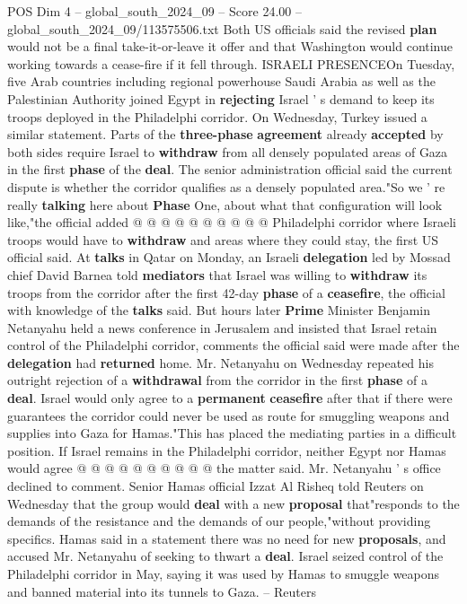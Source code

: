 \begin{textsample}{POS Dim 4 – global\_south\_2024\_09 – Score 24.00 – global\_south\_2024\_09/113575506.txt}
Both US officials said the revised \textbf{plan} would not be a final take-it-or-leave it offer and that Washington would continue working towards a cease-fire if it fell through.
ISRAELI PRESENCEOn Tuesday, five Arab countries including regional powerhouse Saudi Arabia as well as the Palestinian Authority joined Egypt in \textbf{rejecting} Israel ' s demand to keep its troops deployed in the Philadelphi corridor.
On Wednesday, Turkey issued a similar statement.
Parts of the \textbf{three-phase} \textbf{agreement} already \textbf{accepted} by both sides require Israel to \textbf{withdraw} from all densely populated areas of Gaza in the first \textbf{phase} of the \textbf{deal}.
The senior administration official said the current dispute is whether the corridor qualifies as a densely populated area."So we ' re really \textbf{talking} here about \textbf{Phase} One, about what that configuration will look like,"the official added @ @ @ @ @ @ @ @ @ @ Philadelphi corridor where Israeli troops would have to \textbf{withdraw} and areas where they could stay, the first US official said.
At \textbf{talks} in Qatar on Monday, an Israeli \textbf{delegation} led by Mossad chief David Barnea told \textbf{mediators} that Israel was willing to \textbf{withdraw} its troops from the corridor after the first 42-day \textbf{phase} of a \textbf{ceasefire}, the official with knowledge of the \textbf{talks} said.
But hours later \textbf{Prime} Minister Benjamin Netanyahu held a news conference in Jerusalem and insisted that Israel retain control of the Philadelphi corridor, comments the official said were made after the \textbf{delegation} had \textbf{returned} home.
Mr.
Netanyahu on Wednesday repeated his outright rejection of a \textbf{withdrawal} from the corridor in the first \textbf{phase} of a \textbf{deal}.
Israel would only agree to a \textbf{permanent} \textbf{ceasefire} after that if there were guarantees the corridor could never be used as route for smuggling weapons and supplies into Gaza for Hamas."This has placed the mediating parties in a difficult position.
If Israel remains in the Philadelphi corridor, neither Egypt nor Hamas would agree @ @ @ @ @ @ @ @ @ @ the matter said.
Mr.
Netanyahu ' s office declined to comment.
Senior Hamas official Izzat Al Risheq told Reuters on Wednesday that the group would \textbf{deal} with a new \textbf{proposal} that"responds to the demands of the resistance and the demands of our people,"without providing specifics.
Hamas said in a statement there was no need for new \textbf{proposals}, and accused Mr.
Netanyahu of seeking to thwart a \textbf{deal}.
Israel seized control of the Philadelphi corridor in May, saying it was used by Hamas to smuggle weapons and banned material into its tunnels to Gaza. -- Reuters

\end{textsample}
